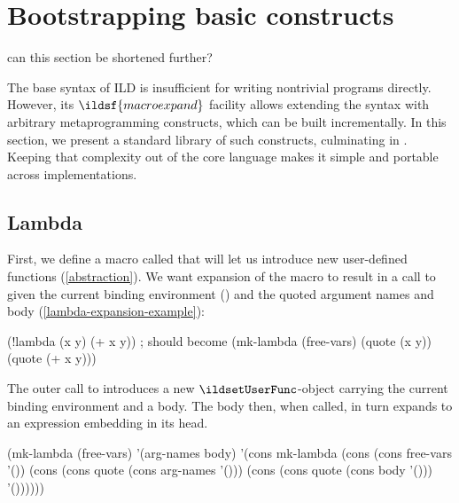 \section{Bootstrapping basic constructs}
\label{bootstrapping-basic}

\begin{note}
can this section be shortened further?
\end{note}

The base syntax of ILD is insufficient for writing nontrivial programs
directly. However, its \(\ildsf{macroexpand}\) facility allows
extending the syntax with arbitrary metaprogramming constructs, which can
be built incrementally.
In this section, we present a standard library
of such constructs, culminating in .
Keeping that complexity out of the core language makes it simple and portable
across implementations.

\subsection{Lambda}
\label{lambda-macro}
First, we define a macro called  that will let us introduce new
user-defined functions (\cref{abstraction}). We want expansion of the 
macro to result in a call to  given the current binding environment
() and the quoted argument names and body (\cref{lambda-expansion-example}):
\begin{listingbox}\begin{ildcode}
(!lambda (x y) (+ x y))
; should become
(mk-lambda (free-vars) (quote (x y))
  (quote (+ x y)))
\end{ildcode}\end{listingbox}
\label{lambda-expansion-example}
The outer call to  introduces a new \(\ildsetUserFunc\)-object
carrying the current binding environment
and a body. The body then, when called, in turn
expands to an expression embedding  in its head.
\begin{listingbox}\begin{ildcode}
(mk-lambda
  (free-vars)
  '(arg-names body)
  '(cons mk-lambda
    (cons (cons free-vars '())
      (cons (cons quote (cons arg-names '()))
        (cons (cons quote (cons body '()))
          '())))))
\end{ildcode}\end{listingbox}
\label{lambda-macro-def}

